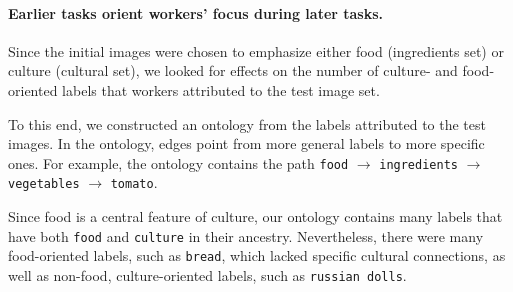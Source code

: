 \documentclass[letterpaper]{article}
\begin{document}
\paragraph{Earlier tasks orient workers' focus during later tasks.} 
Since the initial images were chosen to emphasize either food (ingredients set)
or culture (cultural set), we looked for effects on the number of culture- and 
food-oriented labels that workers attributed to the test image set.

To this end, we constructed an ontology from the labels attributed to the 
test images.  In the ontology, edges point from more general labels to more 
specific ones.  For example, the ontology contains the path \texttt{food} 
$\to$ \texttt{ingredients} $\to$ \texttt{vegetables} $\to$ \texttt{tomato}.

Since food is a central feature 
of culture, our ontology contains many labels that have both \texttt{food}
and \texttt{culture} in their ancestry.  Nevertheless, there were many 
food-oriented labels, such as \texttt{bread}, which lacked specific cultural 
connections, as well as non-food, culture-oriented labels, such as 
\texttt{russian dolls}. 
\end{document}

